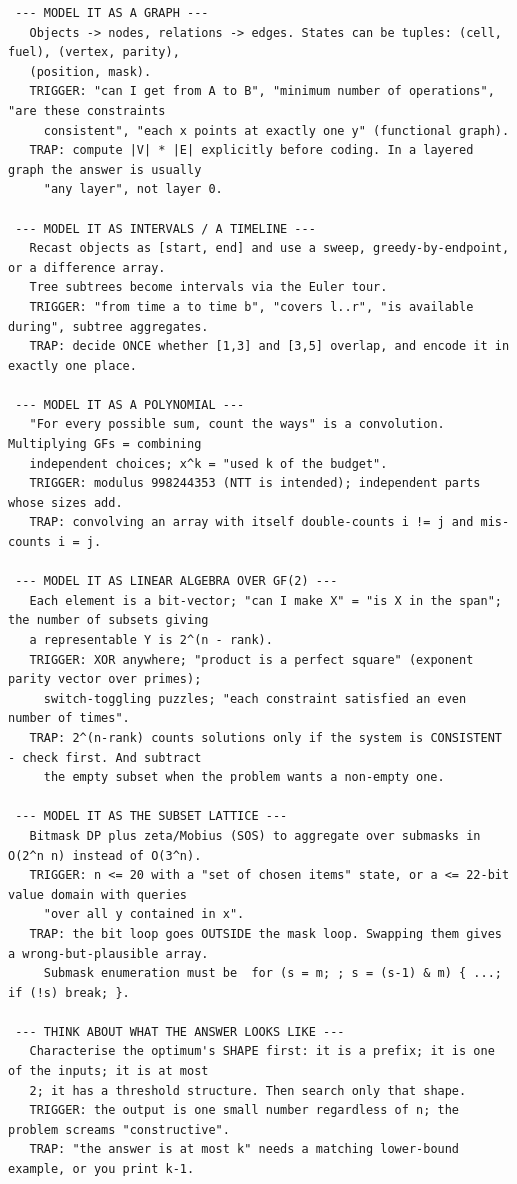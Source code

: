 \documentclass[9pt,a4paper,twocolumn]{extarticle}
\begin{document}
\begin{lstlisting}
 --- MODEL IT AS A GRAPH ---
   Objects -> nodes, relations -> edges. States can be tuples: (cell, fuel), (vertex, parity),
   (position, mask).
   TRIGGER: "can I get from A to B", "minimum number of operations", "are these constraints
     consistent", "each x points at exactly one y" (functional graph).
   TRAP: compute |V| * |E| explicitly before coding. In a layered graph the answer is usually
     "any layer", not layer 0.

 --- MODEL IT AS INTERVALS / A TIMELINE ---
   Recast objects as [start, end] and use a sweep, greedy-by-endpoint, or a difference array.
   Tree subtrees become intervals via the Euler tour.
   TRIGGER: "from time a to time b", "covers l..r", "is available during", subtree aggregates.
   TRAP: decide ONCE whether [1,3] and [3,5] overlap, and encode it in exactly one place.

 --- MODEL IT AS A POLYNOMIAL ---
   "For every possible sum, count the ways" is a convolution. Multiplying GFs = combining
   independent choices; x^k = "used k of the budget".
   TRIGGER: modulus 998244353 (NTT is intended); independent parts whose sizes add.
   TRAP: convolving an array with itself double-counts i != j and mis-counts i = j.

 --- MODEL IT AS LINEAR ALGEBRA OVER GF(2) ---
   Each element is a bit-vector; "can I make X" = "is X in the span"; the number of subsets giving
   a representable Y is 2^(n - rank).
   TRIGGER: XOR anywhere; "product is a perfect square" (exponent parity vector over primes);
     switch-toggling puzzles; "each constraint satisfied an even number of times".
   TRAP: 2^(n-rank) counts solutions only if the system is CONSISTENT - check first. And subtract
     the empty subset when the problem wants a non-empty one.

 --- MODEL IT AS THE SUBSET LATTICE ---
   Bitmask DP plus zeta/Mobius (SOS) to aggregate over submasks in O(2^n n) instead of O(3^n).
   TRIGGER: n <= 20 with a "set of chosen items" state, or a <= 22-bit value domain with queries
     "over all y contained in x".
   TRAP: the bit loop goes OUTSIDE the mask loop. Swapping them gives a wrong-but-plausible array.
     Submask enumeration must be  for (s = m; ; s = (s-1) & m) { ...; if (!s) break; }.

 --- THINK ABOUT WHAT THE ANSWER LOOKS LIKE ---
   Characterise the optimum's SHAPE first: it is a prefix; it is one of the inputs; it is at most
   2; it has a threshold structure. Then search only that shape.
   TRIGGER: the output is one small number regardless of n; the problem screams "constructive".
   TRAP: "the answer is at most k" needs a matching lower-bound example, or you print k-1.


\end{lstlisting}
\end{document}
